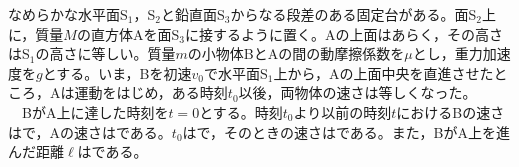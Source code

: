 \item
        \begin{mawarikomi}{150pt}{}
            なめらかな水平面S$_1$，S$_2$と鉛直面S$_3$からなる段差のある固定台がある。面S$_2$上に，質量$M$の直方体Aを面S$_3$に接するように置く。Aの上面はあらく，その高さはS$_1$の高さに等しい。質量$m$の小物体BとAの間の動摩擦係数を$\mu $とし，重力加速度を$g$とする。いま，Bを初速$v_0$で水平面S$_1$上から，Aの上面中央を直進させたところ，Aは運動をはじめ，ある時刻$t_0$以後，両物体の速さは等しくなった。\\
            \hakosyokika
            ~~BがA上に達した時刻を$t=0$とする。時刻$t_0$より以前の時刻$t$におけるBの速さは\Hako で，Aの速さは\Hako である。$t_0$は\Hako で，そのときの速さは\Hako である。また，BがA上を進んだ距離$\ell $は\Hako である。
        \end{mawarikomi}
